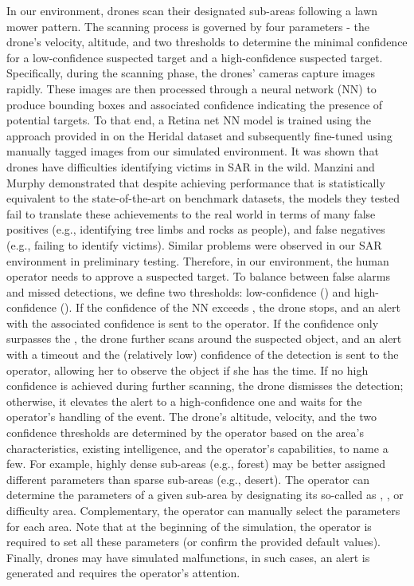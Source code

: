 In our environment, drones scan their designated sub-areas following a lawn mower pattern. The scanning process is governed by four parameters - the drone's velocity, altitude, and two thresholds to determine the minimal confidence for a low-confidence suspected target and a high-confidence suspected target. Specifically, during the scanning phase, the drones' cameras capture images rapidly. These images are then processed through a neural network (NN) to produce bounding boxes and associated confidence indicating the presence of potential targets. To that end, a Retina net \cite{retina:20} NN model is trained using the approach provided in \cite{AIR:21} on the Heridal dataset \cite{heridal-lrbkc_dataset} and subsequently fine-tuned using manually tagged images from our simulated environment. It was shown that drones have difficulties identifying victims in SAR in the wild. Manzini and  Murphy \cite{manzini2023open} demonstrated that despite achieving performance that is statistically equivalent to the state-of-the-art on benchmark datasets, the models they tested fail to translate these achievements to the real world in terms of many false positives (e.g., identifying tree limbs and rocks as people), and false negatives (e.g., failing to identify victims). Similar problems were observed in our SAR environment in preliminary testing. 
Therefore, in our environment, the human operator needs to approve a suspected target. To balance between false alarms and missed detections, we define two thresholds: low-confidence (\pausetreshold) and high-confidence (\detectiothreshold). If the confidence of the NN exceeds \detectiothreshold, the drone stops, and an alert with the associated confidence is sent to the operator. If the confidence only surpasses the \pausetreshold, the drone further scans around the suspected object, and an alert with a timeout and the (relatively low) confidence of the detection is sent to the operator, allowing her to observe the object if she has the time. If no high confidence is achieved during further scanning, the drone dismisses the detection; otherwise, it elevates the alert to a high-confidence one and waits for the operator's handling of the event.
The drone's altitude, velocity, and the two confidence thresholds are determined by the operator based on the area's characteristics, existing intelligence, and the operator's capabilities, to name a few.
For example, highly dense sub-areas (e.g., forest) may be better assigned different parameters than sparse sub-areas (e.g., desert). The operator can determine the parameters of a given sub-area by designating its so-called  as , , or  difficulty area. Complementary, the operator can manually select the parameters for each area. Note that at the beginning of the simulation, the operator is required to set all these parameters (or confirm the provided default values).  
Finally, drones may have simulated malfunctions, in such cases, an alert is generated and requires the operator's attention.  

